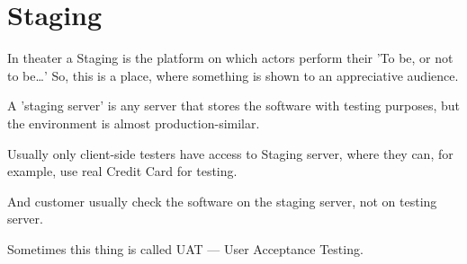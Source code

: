 \section{Staging}
\label{sec:Staging}

In theater a Staging is  the platform on which actors perform their 'To be, or not to be\ldots' So, this is a place, where something is shown to an appreciative audience. 

A 'staging server' is any server that stores the software with testing purposes, but the environment is almost production-similar. 

Usually only client-side testers have access to Staging server, where they can, for example, use real Credit Card for testing.

And customer usually check the software on the staging server, not on testing server.

Sometimes this thing is called UAT — User Acceptance Testing.